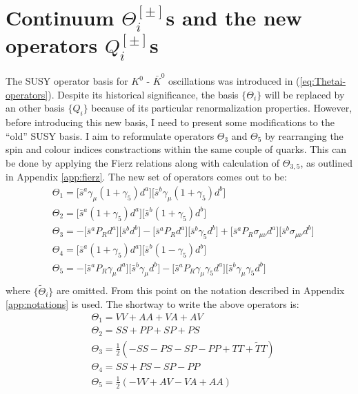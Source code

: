 \documentclass[english, LaM, oneside, noexaminfo]{sapthesis}
\newcommand{\kkb}{$K^0$ - $\bar K^0$ }
\begin{document}
\section{Continuum $\Theta_i^{[\pm]}$s and the new operators $Q_i^{[\pm]}$s}
\noindent
The SUSY operator basis for \kkb oscillations was introduced in (\ref{eq:Thetai-operators}).
Despite its historical significance, the basis $\{\Theta_i\}$ will be replaced by an other basis $\{Q_i\}$ because of its particular renormalization properties.
However, before introducing this new basis, I need to present some modifications to the ``old'' SUSY basis.
\newline
I aim to reformulate operators $\Theta_3$ and $\Theta_5$ by rearranging the spin and colour indices constractions within the same couple of quarks. 
This can be done by applying the Fierz relations \cite{Itzykson-Zuber} along with calculation of $\Theta_{3,5}$, as outlined in Appendix \ref{app:fierz}.
The new set of operators comes out to be:
\begin{equation*}
    \begin{aligned}
        & \Theta_1 = \Big[\bar s^a \gamma_\mu (1+\gamma_5) d^a \Big]\Big[ \bar s^b \gamma_\mu (1+\gamma_5) d^b \Big] \\
        & \Theta_2 = \Big[\bar s^a  (1+\gamma_5) d^a \Big]\Big[ \bar s^b (1+\gamma_5) d^b \Big] \\
        & \Theta_3 = -\Big[\bar s^a  P_R d^a \Big]\Big[ \bar s^b d^b \Big] - \Big[\bar s^a P_R d^a \Big]\Big[ \bar s^b \gamma_5 d^b \Big] + \Big[\bar s^a P_R \sigma_{\mu\nu} d^a \Big]\Big[ \bar s^b \sigma_{\mu\nu} d^b \Big] \\ 
        & \Theta_4 = \Big[\bar s^a  (1+\gamma_5) d^a \Big]\Big[ \bar s^b (1-\gamma_5) d^b \Big] \\
        & \Theta_5 = -\Big[\bar s^a  P_R\gamma_\mu d^a \Big]\Big[ \bar s^b \gamma_\mu d^b \Big] - \Big[\bar s^a P_R \gamma_\mu \gamma_5 d^a \Big]\Big[ \bar s^b \gamma_\mu\gamma_5 d^b \Big] \\
     \end{aligned}
\end{equation*}
where $\{\tilde\Theta_i\}$ are omitted.
From this point on the notation described in Appendix \ref{app:notations} is used.
The shortway to write the above operators is:
\begin{equation*}
    \begin{aligned}
        & \Theta_1 = VV + AA +VA +AV \\
        & \Theta_2 = SS + PP + SP + PS \\
        & \Theta_3 = \frac{1}{2}\left( -SS-PS-SP-PP+TT+\tilde{T}T \right) \\
        & \Theta_4 = SS + PS - SP - PP \\
        & \Theta_5 = \frac{1}{2}\left(-VV+AV-VA+AA\right) \\
     \end{aligned}
\end{equation*}
\end{document}
